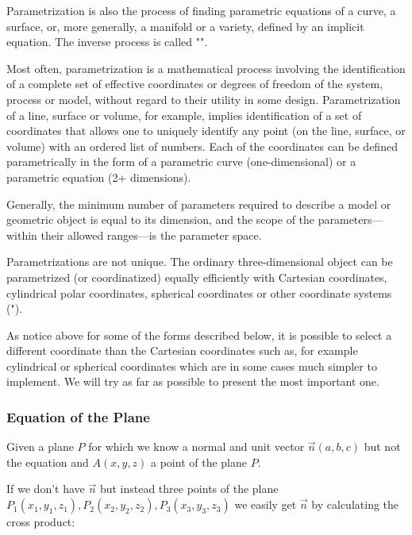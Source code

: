 	Parametrization is also the process of finding parametric equations of a curve, a surface, or, more generally, a manifold or a variety, defined by an implicit equation. The inverse process is called "".
	
	Most often, parametrization is a mathematical process involving the identification of a complete set of effective coordinates or degrees of freedom of the system, process or model, without regard to their utility in some design. Parametrization of a line, surface or volume, for example, implies identification of a set of coordinates that allows one to uniquely identify any point (on the line, surface, or volume) with an ordered list of numbers. Each of the coordinates can be defined parametrically in the form of a parametric curve (one-dimensional) or a parametric equation (2+ dimensions).
	
	Generally, the minimum number of parameters required to describe a model or geometric object is equal to its dimension, and the scope of the parameters—within their allowed ranges—is the parameter space.
	
	\begin{tcolorbox}[title=Remark,colframe=black,arc=10pt]
		Parametrizations are not unique. The ordinary three-dimensional object can be parametrized (or coordinatized) equally efficiently with Cartesian coordinates, cylindrical polar coordinates, spherical coordinates or other coordinate systems (").
	\end{tcolorbox}
	As notice above for some of the forms described below, it is possible to select a different coordinate than the Cartesian coordinates such as, for example cylindrical or spherical coordinates which are in some cases much simpler to implement. We will try as far as possible to present the most important one.
	
	\subsubsection{Equation of the Plane}
	Given a plane $P$ for which we know a normal and unit vector $\vec{n}(a,b,c)$ but not the equation and $A(x,y,z)$ a point of the plane $P$.
	
	\begin{tcolorbox}[title=Remark,colframe=black,arc=10pt]
	If we don't have $\vec{n}$ but instead three points of the plane $P_1(x_1,y_1,z_1),P_2(x_2,y_2,z_2),P_3(x_3,y_3,z_3)$ we easily get  $\vec{n}$ by calculating the cross product:
	
	\end{tcolorbox}
	
